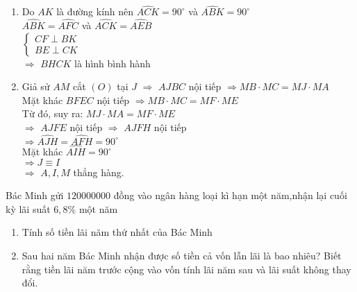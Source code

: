 \begin{ex}
{\begin{enumerate}
	Xét $\triangle MFB$ và $\triangle MCE$:\\
	$\begin{cases} \widehat{MFB}=\widehat{MCE}\\ \widehat{EMC} \end{cases}$\\
	$\Rightarrow \triangle MFB \backsim \triangle MCE$
	\item Do $AK$ là đường kính nên $\widehat{ACK} =90 ^\circ$ và $\widehat{ABK}= 90 ^\circ$\\
	$\widehat{ABK} = \widehat{AFC}$ và $\widehat{ACK} = \widehat{AEB}$\\
	$\begin{cases} CF \perp BK \\ BE \perp CK \end{cases}$\\
	$\Rightarrow$ $BHCK$ là hình bình hành
	\item Giả sử $AM$ cắt $(O)$ tại $J$ $\Rightarrow$ $AJBC$ nội tiếp $\Rightarrow MB \cdot MC=MJ \cdot MA$\\
	Mặt khác $BFEC$ nội tiếp $\Rightarrow MB \cdot MC=MF \cdot ME$\\
	Từ đó, suy ra: $MJ \cdot MA=MF \cdot ME$\\
	$\Rightarrow$ $AJFE$ nội tiếp $\Rightarrow$ $AJFH$ nội tiếp\\
	$\Rightarrow\widehat{AJH} = \widehat{AFH}=90 ^\circ$\\
	Mặt khác $\widehat{AIH}=90 ^\circ$ \\
	$\Rightarrow J \equiv I$\\
	$\Rightarrow$ $A,I,M$ thẳng hàng. 
\end{enumerate}			  
}	
\end{ex}		
\begin{ex}%
Bác Minh gửi $120000000$ đồng vào ngân hàng loại kì hạn một năm,nhận lại cuối kỳ lãi suất $6,8\%$ một năm
\begin{enumerate}
\item Tính số tiền lãi năm thứ nhất của Bác Minh
\item Sau hai năm Bác Minh nhận được số tiền cả vốn lẫn lãi là bao nhiêu? Biết rằng tiền lãi năm trước cộng vào vốn tính lãi năm sau và lãi suất không thay đổi.
\end{enumerate}
\end{ex}
